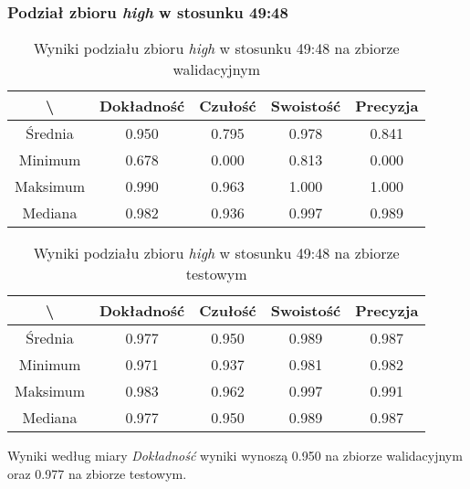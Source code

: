 \subsubsection{Podział zbioru \textit{high} w stosunku 49:48}


\begin{table}[H]
	\centering
	\caption{Wyniki podziału zbioru \textit{high} w stosunku 49:48 na zbiorze walidacyjnym}
	\vspace{6pt}
	{\footnotesize
		\begin{tabular}{|c|c|c|c|c|}
      \hline \textbackslash & Dokładność & Czułość & Swoistość & Precyzja \\
      \hline Średnia & 0.950 & 0.795 & 0.978 & 0.841 \\
      \hline Minimum & 0.678 & 0.000 & 0.813 & 0.000 \\
      \hline Maksimum & 0.990 & 0.963 & 1.000 & 1.000 \\
      \hline Mediana & 0.982 & 0.936 & 0.997 & 0.989 \\
      \hline
    \end{tabular}
    \label{Tab:highsplitd_val}
	}
	\vspace{0pt}
\end{table}

\begin{table}[H]
	\centering
	\caption{Wyniki podziału zbioru \textit{high} w stosunku 49:48 na zbiorze testowym}
	\vspace{6pt}
	{\footnotesize
		\begin{tabular}{|c|c|c|c|c|}
      \hline \textbackslash & Dokładność & Czułość & Swoistość & Precyzja \\
      \hline Średnia & 0.977 & 0.950 & 0.989 & 0.987 \\
      \hline Minimum & 0.971 & 0.937 & 0.981 & 0.982 \\
      \hline Maksimum & 0.983 & 0.962 & 0.997 & 0.991 \\
      \hline Mediana & 0.977 & 0.950 & 0.989 & 0.987 \\
      \hline
    \end{tabular}
    \label{Tab:highsplitd_test}
	}
	\vspace{0pt}
\end{table}

Wyniki według miary \textit{Dokładność} wyniki wynoszą 0.950 na zbiorze walidacyjnym oraz 0.977 na zbiorze testowym.
